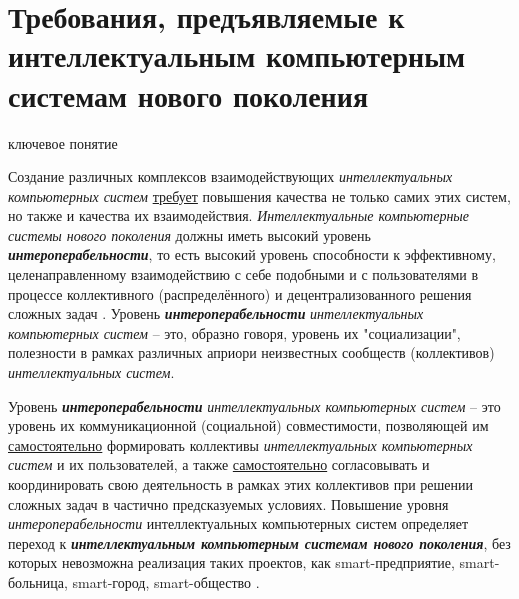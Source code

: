 \section{Требования, предъявляемые к интеллектуальным компьютерным системам нового поколения}

\begin{SCn}
\begin{scnrelfromlist}{ключевое понятие}
\end{scnrelfromlist}	 
\end{SCn}

Создание различных комплексов взаимодействующих \textit{интеллектуальных компьютерных систем} \underline{требует} повышения качества не только самих этих систем, но также и качества их взаимодействия. \textit{Интеллектуальные компьютерные системы нового поколения} должны иметь высокий уровень \textbf{\textit{интероперабельности}}, то есть высокий уровень способности к эффективному, целенаправленному взаимодействию с себе подобными и с пользователями в процессе коллективного (распределённого) и децентрализованного решения сложных задач \cite{Yaghoobirafi2022,Ouksel1999,Lanzenberger2008,Neiva2016,Pohl2004,Waters2009}. Уровень \textbf{\textit{интероперабельности}} \textit{интеллектуальных компьютерных систем} -- это, образно говоря, уровень их "социализации"{}, полезности в рамках различных априори неизвестных сообществ (коллективов) \textit{интеллектуальных систем}.

Уровень \textbf{\textit{интероперабельности}} \textit{интеллектуальных компьютерных систем} -- это уровень их коммуникационной (социальной) совместимости, позволяющей им \underline{самостоятельно} формировать коллективы \textit{интеллектуальных компьютерных систем} и их пользователей, а также \underline{самостоятельно} согласовывать и координировать свою деятельность в рамках этих коллективов при решении сложных задач в частично предсказуемых условиях. Повышение уровня \textit{интероперабельности} интеллектуальных компьютерных систем определяет переход к \textbf{\textit{интеллектуальным компьютерным системам нового поколения}}, без которых невозможна реализация таких проектов, как smart-предприятие, smart-больница, smart-город, smart-общество \cite{Lopes2022,Hamilton2006}.


